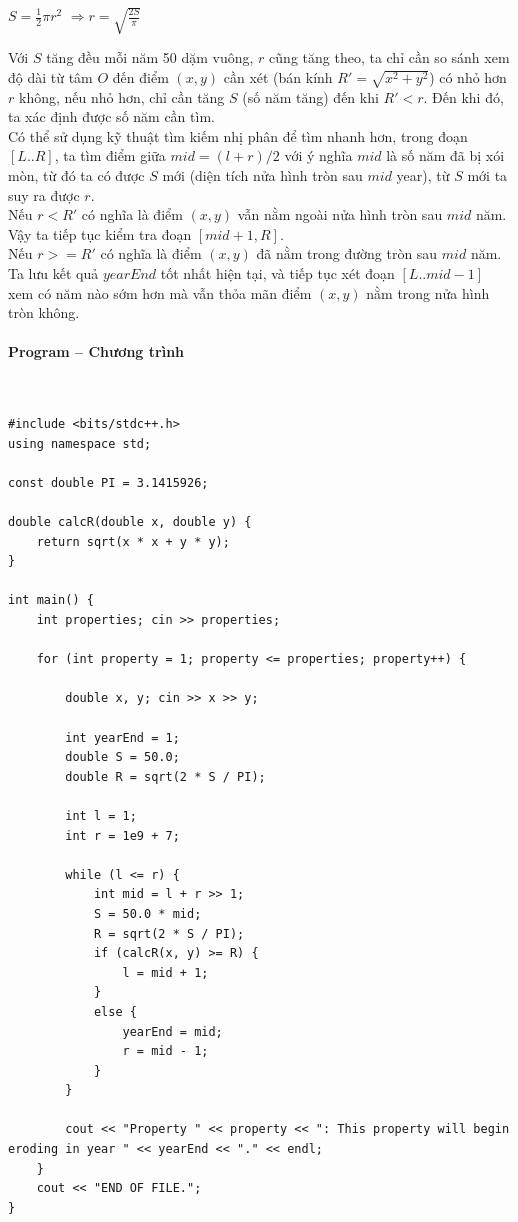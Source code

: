 \documentclass{article}
\begin{document}
\begin{center}
    $S = \frac{1}{2}\pi r^2$
    $\Rightarrow{r = \sqrt{\frac{2S}{\pi}}}$
\end{center}

Với $S$ tăng đều mỗi năm 50 dặm vuông, $r$ cũng tăng theo, ta chỉ cần so sánh xem độ dài từ tâm $O$ đến điểm $(x,y)$ cần xét (bán kính $R' = \sqrt{x^2+y^2}$) có nhỏ hơn $r$ không, nếu nhỏ hơn, chỉ cần tăng $S$ (số năm tăng) đến khi $R' < r$. Đến khi đó, ta xác định được số năm cần tìm. \\ 

Có thể sử dụng kỹ thuật tìm kiếm nhị phân để tìm nhanh hơn, trong đoạn $[L..R]$, ta tìm điểm giữa $mid = (l + r) / 2$ với ý nghĩa $mid$ là số năm đã bị xói mòn, từ đó ta có được $S$ mới (diện tích nửa hình tròn sau $mid$ year), từ $S$ mới ta suy ra được $r$.\\

Nếu $r < R'$ có nghĩa là điểm $(x,y)$ vẫn nằm ngoài nửa hình tròn sau $mid$ năm. Vậy ta tiếp tục kiểm tra đoạn $[mid + 1, R]$. \\
Nếu $r >= R'$ có nghĩa là điểm $(x,y)$ đã nằm trong đường tròn sau $mid$ năm. Ta lưu kết quả $yearEnd$ tốt nhất hiện tại, và tiếp tục xét đoạn $[L..mid-1]$ xem có năm nào sớm hơn mà vẫn thỏa mãn điểm $(x,y)$ nằm trong nửa hình tròn không.

\paragraph{Program -- Chương trình} \mbox{} \\



\begin{lstlisting}
#include <bits/stdc++.h>
using namespace std;

const double PI = 3.1415926;

double calcR(double x, double y) {
	return sqrt(x * x + y * y);
}

int main() {
	int properties; cin >> properties;

	for (int property = 1; property <= properties; property++) {
		
		double x, y; cin >> x >> y;

		int yearEnd = 1;
		double S = 50.0;
		double R = sqrt(2 * S / PI);

		int l = 1;
		int r = 1e9 + 7;

		while (l <= r) {
			int mid = l + r >> 1;
			S = 50.0 * mid;
			R = sqrt(2 * S / PI);
			if (calcR(x, y) >= R) {
				l = mid + 1;
			}
			else {
				yearEnd = mid;
				r = mid - 1;
			}
		}

		cout << "Property " << property << ": This property will begin eroding in year " << yearEnd << "." << endl;
	}
	cout << "END OF FILE.";
}
\end{lstlisting}
\end{document}
